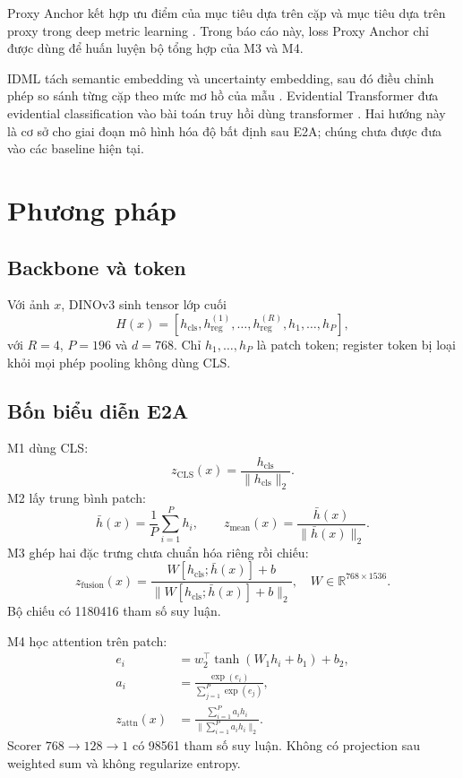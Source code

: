 \documentclass[11pt,a4paper]{article}
\newcommand{\ltwo}[1]{\frac{#1}{\lVert #1\rVert_2}}
\begin{document}
Proxy Anchor kết hợp ưu điểm của mục tiêu dựa trên cặp và mục tiêu dựa trên proxy trong deep metric learning \cite{kim2020proxy}. Trong báo cáo này, loss Proxy Anchor chỉ được dùng để huấn luyện bộ tổng hợp của M3 và M4.

IDML tách semantic embedding và uncertainty embedding, sau đó điều chỉnh phép so sánh từng cặp theo mức mơ hồ của mẫu \cite{wang2023idml}. Evidential Transformer đưa evidential classification vào bài toán truy hồi dùng transformer \cite{dordevic2024evidential}. Hai hướng này là cơ sở cho giai đoạn mô hình hóa độ bất định sau E2A; chúng chưa được đưa vào các baseline hiện tại.

\section{Phương pháp}
\subsection{Backbone và token}
Với ảnh $x$, DINOv3 sinh tensor lớp cuối
\begin{equation}
H(x)=[h_{\mathrm{cls}},h_{\mathrm{reg}}^{(1)},\ldots,h_{\mathrm{reg}}^{(R)},h_1,\ldots,h_P],
\end{equation}
với $R=4$, $P=196$ và $d=768$. Chỉ $h_1,\ldots,h_P$ là patch token; register token bị loại khỏi mọi phép pooling không dùng CLS.

\subsection{Bốn biểu diễn E2A}
M1 dùng CLS:
\begin{equation} z_{\mathrm{CLS}}(x)=\ltwo{h_{\mathrm{cls}}}. \end{equation}
M2 lấy trung bình patch:
\begin{equation}
\bar h(x)=\frac{1}{P}\sum_{i=1}^{P}h_i,\qquad z_{\mathrm{mean}}(x)=\ltwo{\bar h(x)}.
\end{equation}
M3 ghép hai đặc trưng chưa chuẩn hóa riêng rồi chiếu:
\begin{equation}
z_{\mathrm{fusion}}(x)=\ltwo{W[h_{\mathrm{cls}};\bar h(x)]+b},
\quad W\in\mathbb{R}^{768\times1536}.
\end{equation}
Bộ chiếu có \num{1180416} tham số suy luận.

M4 học attention trên patch:
\begin{align}
e_i &= w_2^\top\tanh(W_1h_i+b_1)+b_2,\\
a_i &= \frac{\exp(e_i)}{\sum_{j=1}^{P}\exp(e_j)},\\
z_{\mathrm{attn}}(x) &= \ltwo{\sum_{i=1}^{P}a_i h_i}.
\end{align}
Scorer $768\rightarrow128\rightarrow1$ có \num{98561} tham số suy luận. Không có projection sau weighted sum và không regularize entropy.
\end{document}
